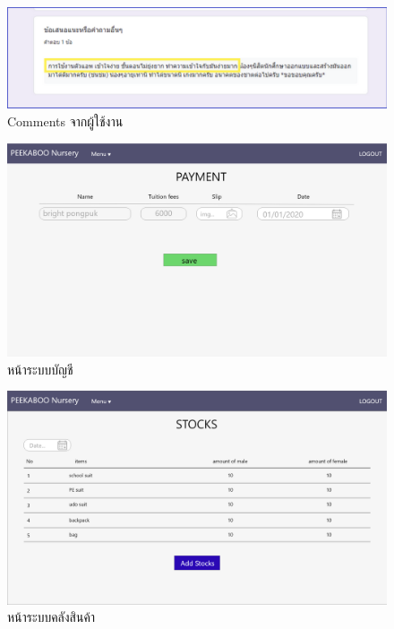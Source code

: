 \begin{figure}
  \begin{center}
    \includegraphics[width=\linewidth]{images/eval4.png}
  \end{center}
  \caption[Comments จากผู้ใช้งาน]{Comments จากผู้ใช้งาน}
  \label{fig:Eval4}
\end{figure}

\begin{figure}
  \begin{center}
    \includegraphics[width=\linewidth]{images/paymentPage.png}
  \end{center}
  \caption[หน้าระบบบัญชี]{หน้าระบบบัญชี}
  \label{fig:old1}
\end{figure}

\begin{figure}
  \begin{center}
    \includegraphics[width=\linewidth]{images/stockPage.png}
  \end{center}
  \caption[หน้าระบบคลังสินค้า]{หน้าระบบคลังสินค้า}
  \label{fig:old2}
\end{figure}

